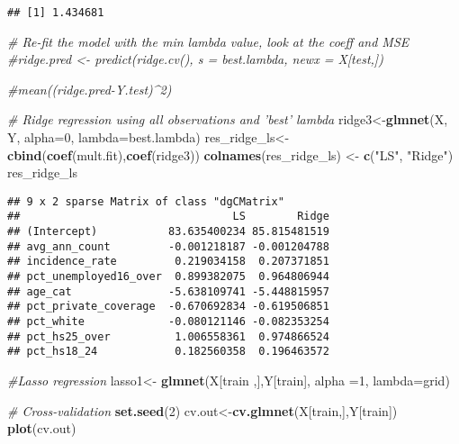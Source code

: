 \documentclass[]{article}
\newenvironment{Shaded}{\begin{snugshade}}{\end{snugshade}}
\newcommand{\KeywordTok}[1]{\textcolor[rgb]{0.13,0.29,0.53}{\textbf{#1}}}
\newcommand{\DataTypeTok}[1]{\textcolor[rgb]{0.13,0.29,0.53}{#1}}
\newcommand{\DecValTok}[1]{\textcolor[rgb]{0.00,0.00,0.81}{#1}}
\newcommand{\StringTok}[1]{\textcolor[rgb]{0.31,0.60,0.02}{#1}}
\newcommand{\CommentTok}[1]{\textcolor[rgb]{0.56,0.35,0.01}{\textit{#1}}}
\newcommand{\NormalTok}[1]{#1}
\begin{document}
\begin{verbatim}
## [1] 1.434681
\end{verbatim}

\begin{Shaded}
\begin{Highlighting}[]
\CommentTok{# Re-fit the model with the min lambda value, look at the coeff and MSE}
\CommentTok{#ridge.pred <- predict(ridge.cv(), s = best.lambda, newx = X[test,])}

\CommentTok{#mean((ridge.pred-Y.test)^2)}

\CommentTok{# Ridge regression using all observations and 'best' lambda}
\NormalTok{ridge3<-}\KeywordTok{glmnet}\NormalTok{(X, Y, }\DataTypeTok{alpha=}\DecValTok{0}\NormalTok{, }\DataTypeTok{lambda=}\NormalTok{best.lambda)}
\NormalTok{res_ridge_ls<-}\StringTok{ }\KeywordTok{cbind}\NormalTok{(}\KeywordTok{coef}\NormalTok{(mult.fit),}\KeywordTok{coef}\NormalTok{(ridge3))}
\KeywordTok{colnames}\NormalTok{(res_ridge_ls) <-}\StringTok{ }\KeywordTok{c}\NormalTok{(}\StringTok{"LS"}\NormalTok{, }\StringTok{"Ridge"}\NormalTok{)}
\NormalTok{res_ridge_ls}
\end{Highlighting}
\end{Shaded}

\begin{verbatim}
## 9 x 2 sparse Matrix of class "dgCMatrix"
##                                 LS        Ridge
## (Intercept)           83.635400234 85.815481519
## avg_ann_count         -0.001218187 -0.001204788
## incidence_rate         0.219034158  0.207371851
## pct_unemployed16_over  0.899382075  0.964806944
## age_cat               -5.638109741 -5.448815957
## pct_private_coverage  -0.670692834 -0.619506851
## pct_white             -0.080121146 -0.082353254
## pct_hs25_over          1.006558361  0.974866524
## pct_hs18_24            0.182560358  0.196463572
\end{verbatim}

\begin{Shaded}
\begin{Highlighting}[]
\CommentTok{#Lasso regression}
\NormalTok{lasso1<-}\StringTok{ }\KeywordTok{glmnet}\NormalTok{(X[train ,],Y[train], }\DataTypeTok{alpha =}\DecValTok{1}\NormalTok{, }\DataTypeTok{lambda=}\NormalTok{grid)}


\CommentTok{# Cross-validation}
\KeywordTok{set.seed}\NormalTok{(}\DecValTok{2}\NormalTok{)}
\NormalTok{cv.out<-}\KeywordTok{cv.glmnet}\NormalTok{(X[train,],Y[train])}
\KeywordTok{plot}\NormalTok{(cv.out)}
\end{Highlighting}
\end{Shaded}
\end{document}
